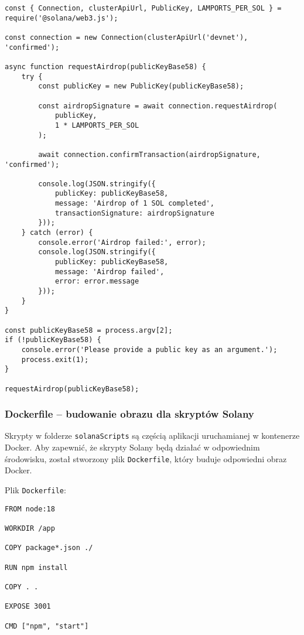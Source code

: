 \begin{verbatim}
const { Connection, clusterApiUrl, PublicKey, LAMPORTS_PER_SOL } = require('@solana/web3.js');

const connection = new Connection(clusterApiUrl('devnet'), 'confirmed');

async function requestAirdrop(publicKeyBase58) {
    try {
        const publicKey = new PublicKey(publicKeyBase58);

        const airdropSignature = await connection.requestAirdrop(
            publicKey,
            1 * LAMPORTS_PER_SOL
        );

        await connection.confirmTransaction(airdropSignature, 'confirmed');

        console.log(JSON.stringify({
            publicKey: publicKeyBase58,
            message: 'Airdrop of 1 SOL completed',
            transactionSignature: airdropSignature
        }));
    } catch (error) {
        console.error('Airdrop failed:', error);
        console.log(JSON.stringify({
            publicKey: publicKeyBase58,
            message: 'Airdrop failed',
            error: error.message
        }));
    }
}

const publicKeyBase58 = process.argv[2];
if (!publicKeyBase58) {
    console.error('Please provide a public key as an argument.');
    process.exit(1);
}

requestAirdrop(publicKeyBase58);

\end{verbatim}

\subsubsection{Dockerfile – budowanie obrazu dla skryptów Solany}

Skrypty w folderze \texttt{solanaScripts} są częścią aplikacji uruchamianej w kontenerze Docker. Aby zapewnić, że skrypty Solany będą działać w odpowiednim środowisku, został stworzony plik \texttt{Dockerfile}, który buduje odpowiedni obraz Docker.

Plik \texttt{Dockerfile}:

\begin{verbatim}
FROM node:18

WORKDIR /app

COPY package*.json ./

RUN npm install

COPY . .

EXPOSE 3001

CMD ["npm", "start"]
\end{verbatim}

